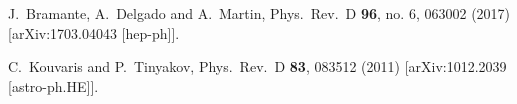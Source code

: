   J.~Bramante, A.~Delgado and A.~Martin,
  Phys.\ Rev.\ D {\bf 96}, no. 6, 063002 (2017)
  [arXiv:1703.04043 [hep-ph]].


  C.~Kouvaris and P.~Tinyakov,
  Phys.\ Rev.\ D {\bf 83}, 083512 (2011)
  [arXiv:1012.2039 [astro-ph.HE]].

